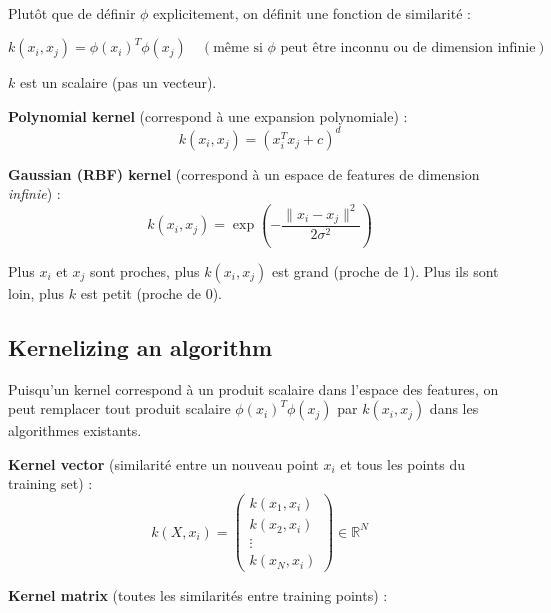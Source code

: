 \documentclass[11pt,a4paper,openany]{book}
\begin{document}
\vspace{0.6cm}

Plutôt que de définir $\phi$ explicitement, on définit une fonction de similarité :

\[
k(x_i, x_j)
=
\phi(x_i)^T \phi(x_j)
\quad (\text{même si } \phi \text{ peut être inconnu ou de dimension infinie})
\]

\vspace{0.5cm}

$k$ est un scalaire (pas un vecteur).

\vspace{0.8cm}

\begin{exbox}[title=Exemples de kernels]
\textbf{Polynomial kernel} (correspond à une expansion polynomiale) :
\[
k(x_i, x_j)
=
(x_i^T x_j + c)^d
\]

\textbf{Gaussian (RBF) kernel} (correspond à un espace de features de dimension \textit{infinie}) :
\[
k(x_i, x_j)
=
\exp\left(
-
\frac{\|x_i - x_j\|^2}{2\sigma^2}
\right)
\]

Plus $x_i$ et $x_j$ sont proches, plus $k(x_i, x_j)$ est grand (proche de 1). Plus ils sont loin, plus $k$ est petit (proche de 0).
\end{exbox}

\vspace{1cm}

\subsection{Kernelizing an algorithm}

Puisqu'un kernel correspond à un produit scalaire dans l'espace des features, on peut remplacer tout produit scalaire $\phi(x_i)^T \phi(x_j)$ par $k(x_i, x_j)$ dans les algorithmes existants.

\vspace{0.5cm}

\textbf{Kernel vector} (similarité entre un nouveau point $x_i$ et tous les points du training set) :
\[
k(X, x_i)
=
\begin{pmatrix}
k(x_1, x_i) \\
k(x_2, x_i) \\
\vdots \\
k(x_N, x_i)
\end{pmatrix}
\in \mathbb{R}^N
\]

\vspace{0.6cm}

\textbf{Kernel matrix} (toutes les similarités entre training points) :
\end{document}
